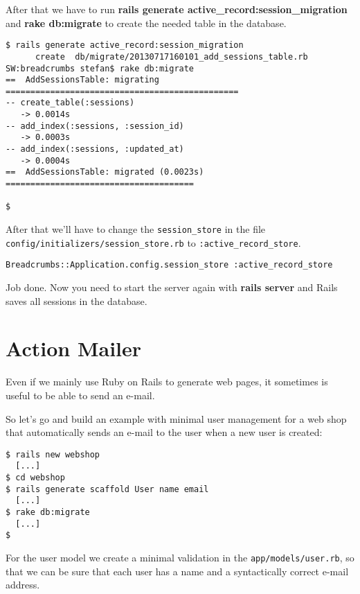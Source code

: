 \documentclass[a4paper]{book}
\newcounter{tab}[chapter]
\newcommand{\chap}[1]{\newpage\thispagestyle{empty}\chapter{#1}\label{chap:\thechapter}}
\begin{document}
After that we have to run \textbf{rails generate active\_record:session\_migration} and \textbf{rake db:migrate} to create the needed table in the database.

\begin{shaded}\begin{verbatim}
$ rails generate active_record:session_migration
      create  db/migrate/20130717160101_add_sessions_table.rb
SW:breadcrumbs stefan$ rake db:migrate
==  AddSessionsTable: migrating ===============================================
-- create_table(:sessions)
   -> 0.0014s
-- add_index(:sessions, :session_id)
   -> 0.0003s
-- add_index(:sessions, :updated_at)
   -> 0.0004s
==  AddSessionsTable: migrated (0.0023s) ======================================

$
\end{verbatim}\end{shaded}

After that we'll have to change the \texttt{session\_store} in the file \texttt{config/initializers/session\_store.rb} to \texttt{:active\_record\_store}.

\begin{shaded}\begin{verbatim}
Breadcrumbs::Application.config.session_store :active_record_store
\end{verbatim}\end{shaded}

Job done. Now you need to start the server again with \textbf{rails server} and Rails saves all sessions in the database.

\chap{Action Mailer}\label{action-mailer}

Even if we mainly use Ruby on Rails to generate web pages, it sometimes is useful to be able to send an e-mail.

So let's go and build an example with minimal user management for a web shop that automatically sends an e-mail to the user when a new user is created:

\begin{shaded}\begin{verbatim}
$ rails new webshop
  [...]
$ cd webshop
$ rails generate scaffold User name email
  [...]
$ rake db:migrate
  [...]
$
\end{verbatim}\end{shaded}

For the user model we create a minimal validation in the \texttt{app/models/user.rb}, so that we can be sure that each user has a name and a syntactically correct e-mail address.
\end{document}
